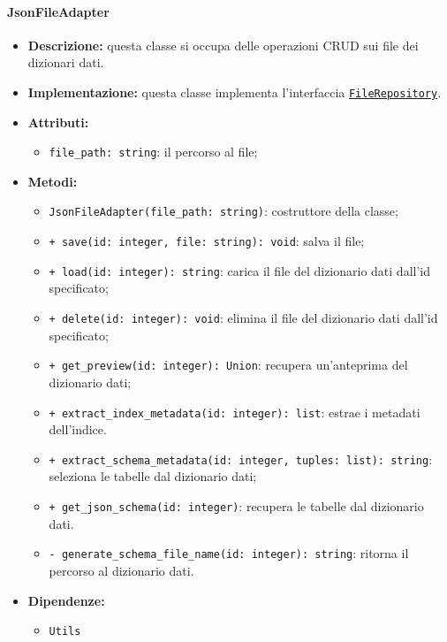 \paragraph{JsonFileAdapter} \label{JsonFileAdapter}
\begin{itemize}
    \item \textbf{Descrizione:} questa classe si occupa delle operazioni CRUD sui file dei dizionari dati.
    \item \textbf{Implementazione:} questa classe implementa l'interfaccia \hyperref[FileRepository]{\texttt{FileRepository}}.
    \item \textbf{Attributi:}
    \begin{itemize}
        \item \texttt{file\_path: string}: il percorso al file;
    \end{itemize}
    \item \textbf{Metodi:}
    \begin{itemize}
        \item \texttt{JsonFileAdapter(file\_path: string)}: costruttore della classe;
        \item \texttt{+ save(id: integer, file: string): void}: salva il file;
        \item \texttt{+ load(id: integer): string}: carica il file del dizionario dati dall'id specificato;
        \item \texttt{+ delete(id: integer): void}: elimina il file del dizionario dati dall'id specificato;
        \item \texttt{+ get\_preview(id: integer): Union}: recupera un'anteprima del dizionario dati;
        \item \texttt{+ extract\_index\_metadata(id: integer): list}: estrae i metadati dell'indice.
        \item \texttt{+ extract\_schema\_metadata(id: integer, tuples: list): string}: seleziona le tabelle dal dizionario dati;
        \item \texttt{+ get\_json\_schema(id: integer)}: recupera le tabelle dal dizionario dati.
        \item \texttt{- generate\_schema\_file\_name(id: integer): string}: ritorna il percorso al dizionario dati. 
    \end{itemize}
    \item \textbf{Dipendenze:}
    \begin{itemize}
        \item \texttt{Utils}
    \end{itemize}
\end{itemize} 